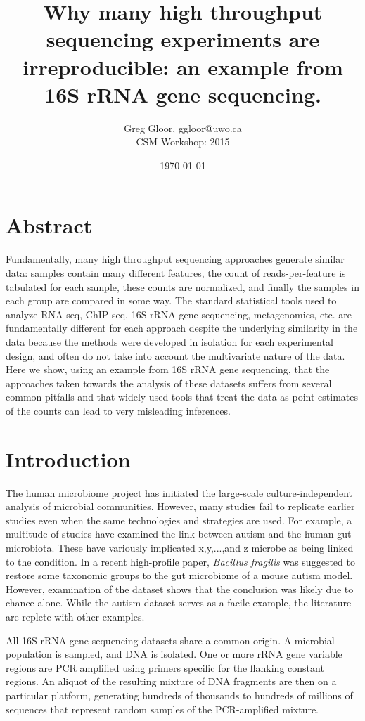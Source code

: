 \documentclass[11pt]{article}\usepackage[]{graphicx}\usepackage[]{color}
\title{Why many high throughput sequencing experiments are irreproducible: an example from 16S rRNA gene sequencing.}
\author{Greg Gloor, ggloor@uwo.ca\\CSM Workshop: 2015}
\date{\today}                                           %
\begin{document}
\maketitle
\tableofcontents
\section{Abstract}
Fundamentally, many high throughput sequencing approaches generate similar data: samples contain many different features, the count  of reads-per-feature is tabulated for each sample, these counts are normalized, and finally the samples in each group are compared in some way.  The standard statistical tools used to analyze RNA-seq, ChIP-seq, 16S rRNA gene sequencing, metagenomics, etc. are fundamentally different for each approach  despite the underlying similarity in the data because the methods were developed in isolation for each experimental design, and often do not take into account the multivariate nature of the data. Here we show, using an example from 16S rRNA gene sequencing, that the approaches taken towards the analysis of these datasets suffers from several common pitfalls and that  widely used tools that treat the data as point estimates of the counts can lead to very misleading inferences.

\section{Introduction}
The human microbiome project has initiated the large-scale culture-independent analysis of microbial communities. However, many studies fail to replicate earlier studies even when the same technologies and strategies are used. For example, a multitude of studies have examined the link between autism and the human gut microbiota. These have variously implicated x,y,...,and z microbe as being linked to the condition. In a recent high-profile paper\cite{Hsiao:2013}, \emph{Bacillus fragilis} was suggested to restore some taxonomic groups to the gut microbiome of a mouse autism model. However, examination of the dataset shows that the conclusion was likely due to chance alone. While the autism dataset serves as a facile example, the literature are replete with other examples. 

All 16S rRNA gene sequencing datasets share a common origin. A microbial population is sampled, and DNA is isolated. One or more rRNA gene variable regions are PCR amplified using primers specific for the flanking constant regions. An aliquot of the resulting mixture of DNA fragments are then on a particular platform, generating hundreds of thousands to hundreds of millions of sequences that represent random samples of the PCR-amplified mixture. 
\end{document}
